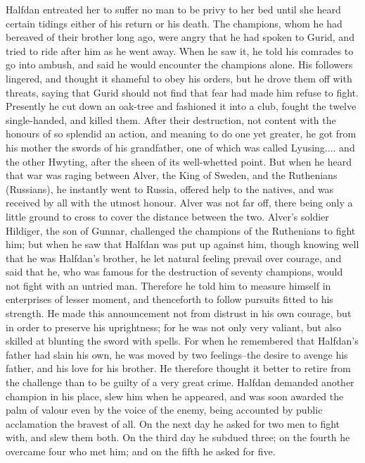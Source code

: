 \documentclass[10pt,a4paper]{report}
\begin{document}
Halfdan entreated her to suffer no man to be privy to her bed until she heard certain tidings either of his return or his death. The champions, whom he had bereaved of their brother long ago, were angry that he had spoken to Gurid, and tried to ride after him as he went away. When he saw it, he told his comrades to go into ambush, and said he would encounter the champions alone. His followers lingered, and thought it shameful to obey his orders, but he drove them off with threats, saying that Gurid should not find that fear had made him refuse to fight. Presently he cut down an oak-tree and fashioned it into a club, fought the twelve single-handed, and killed them. After their destruction, not content with the honours of so splendid an action, and meaning to do one yet greater, he got from his mother the swords of his grandfather, one of which was called Lyusing.... and the other Hwyting, after the sheen of its well-whetted point. But when he heard that war was raging between Alver, the King of Sweden, and the Ruthenians (Russians), he instantly went to Russia, offered help to the natives, and was received by all with the utmost honour. Alver was not far off, there being only a little ground to cross to cover the distance between the two. Alver's soldier Hildiger, the son of Gunnar, challenged the champions of the Ruthenians to fight him; but when he saw that Halfdan was put up against him, though knowing well that he was Halfdan's brother, he let natural feeling prevail over courage, and said that he, who was famous for the destruction of seventy champions, would not fight with an untried man. Therefore he told him to measure himself in enterprises of lesser moment, and thenceforth to follow pursuits fitted to his strength. He made this announcement not from distrust in his own courage, but in order to preserve his uprightness; for he was not only very valiant, but also skilled at blunting the sword with spells. For when he remembered that Halfdan's father had slain his own, he was moved by two feelings--the desire to avenge his father, and his love for his brother. He therefore thought it better to retire from the challenge than to be guilty of a very great crime. Halfdan demanded another champion in his place, slew him when he appeared, and was soon awarded the palm of valour even by the voice of the enemy, being accounted by public acclamation the bravest of all. On the next day he asked for two men to fight with, and slew them both. On the third day he subdued three; on the fourth he overcame four who met him; and on the fifth he asked for five.\\
\end{document}
